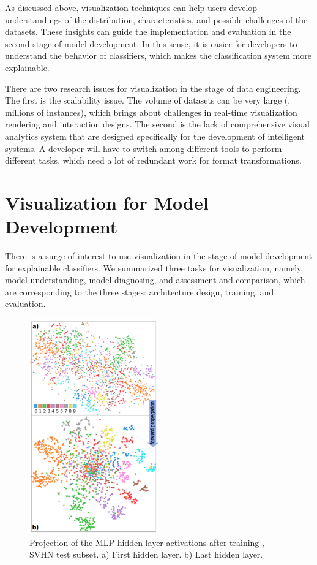 As discussed above, visualization techniques can help users develop understandings of the distribution, characteristics, and possible challenges of the datasets. These insights can guide the implementation and evaluation in the second stage of model development. In this sense, it is easier for developers to understand the behavior of classifiers, which makes the classification system more explainable. 

There are two research issues for visualization in the stage of data engineering. The first is the scalability issue. The volume of datasets can be very large (\eg, millions of instances), which brings about challenges in real-time visualization rendering and interaction designs. The second is the lack of comprehensive visual analytics system that are designed specifically for the development of intelligent systems. A developer will have to switch among different tools to perform different tasks, which need a lot of redundant work for format transformations. 


\section{Visualization for Model Development}

There is a surge of interest to use visualization in the stage of model development for explainable classifiers. We summarized three tasks for visualization, namely, model understanding, model diagnosing, and assessment and comparison, which are corresponding to the three stages: architecture design, training, and evaluation.

\begin{figure}[hbt]
    \centering
    \includegraphics[width=0.5\textwidth]{figure/project-nn}
    \caption{Projection of the MLP hidden layer activations after training \cite{rauber2017hidden-activity}, SVHN test subset. a) First hidden layer. b) Last hidden layer.}
    \label{fig:project-nn}
\end{figure}

